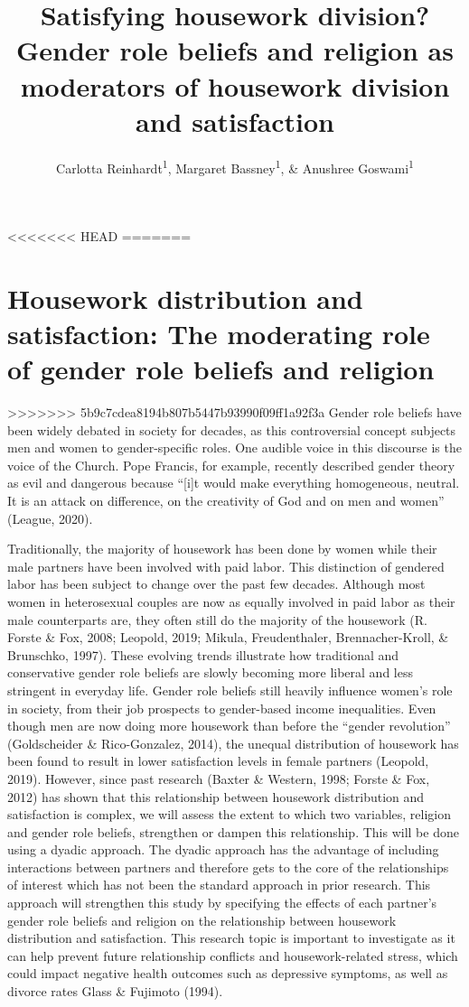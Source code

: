 \documentclass[
  man,floatsintext]{apa6}
\title{Satisfying housework division? Gender role beliefs and religion as moderators of housework division and satisfaction}
\author{Carlotta Reinhardt\textsuperscript{1}, Margaret Bassney\textsuperscript{1}, \& Anushree Goswami\textsuperscript{1}}
\date{}
\affiliation{\vspace{0.5cm}\textsuperscript{1} Smith College}
\begin{document}
\maketitle

<<<<<<< HEAD
=======
\hypertarget{housework-distribution-and-satisfaction-the-moderating-role-of-gender-role-beliefs-and-religion}{%
\section{Housework distribution and satisfaction: The moderating role of gender role beliefs and religion}\label{housework-distribution-and-satisfaction-the-moderating-role-of-gender-role-beliefs-and-religion}}

>>>>>>> 5b9c7cdea8194b807b5447b93990f09ff1a92f3a
Gender role beliefs have been widely debated in society for decades, as this controversial concept subjects men and women to gender-specific roles. One audible voice in this discourse is the voice of the Church. Pope Francis, for example, recently described gender theory as evil and dangerous because ``{[}i{]}t would make everything homogeneous, neutral. It is an attack on difference, on the creativity of God and on men and women'' (League, 2020).

Traditionally, the majority of housework has been done by women while their male partners have been involved with paid labor. This distinction of gendered labor has been subject to change over the past few decades. Although most women in heterosexual couples are now as equally involved in paid labor as their male counterparts are, they often still do the majority of the housework (R. Forste \& Fox, 2008; Leopold, 2019; Mikula, Freudenthaler, Brennacher-Kroll, \& Brunschko, 1997). These evolving trends illustrate how traditional and conservative gender role beliefs are slowly becoming more liberal and less stringent in everyday life. Gender role beliefs still heavily influence women's role in society, from their job prospects to gender-based income inequalities. Even though men are now doing more housework than before the ``gender revolution'' (Goldscheider \& Rico-Gonzalez, 2014), the unequal distribution of housework has been found to result in lower satisfaction levels in female partners (Leopold, 2019). However, since past research (Baxter \& Western, 1998; Forste \& Fox, 2012) has shown that this relationship between housework distribution and satisfaction is complex, we will assess the extent to which two variables, religion and gender role beliefs, strengthen or dampen this relationship.
This will be done using a dyadic approach. The dyadic approach has the advantage of including interactions between partners and therefore gets to the core of the relationships of interest which has not been the standard approach in prior research. This approach will strengthen this study by specifying the effects of each partner's gender role beliefs and religion on the relationship between housework distribution and satisfaction.
This research topic is important to investigate as it can help prevent future relationship conflicts and housework-related stress, which could impact negative health outcomes such as depressive symptoms, as well as divorce rates Glass \& Fujimoto (1994).
\end{document}
